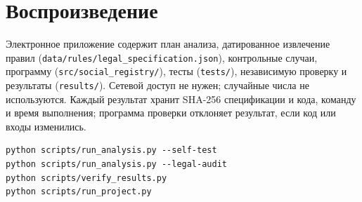 \documentclass[12pt,a4paper]{extarticle}
\begin{document}
\appendix
\section{Воспроизведение}
Электронное приложение содержит план анализа, датированное извлечение правил (\nolinkurl{data/rules/legal_specification.json}), контрольные случаи, программу (\nolinkurl{src/social_registry/}), тесты (\nolinkurl{tests/}), независимую проверку и результаты (\nolinkurl{results/}). Сетевой доступ не нужен; случайные числа не используются. Каждый результат хранит SHA-256 спецификации и кода, команду и время выполнения; программа проверки отклоняет результат, если код или входы изменились.

\begingroup\fontsize{11bp}{13.2bp}\selectfont
\begin{verbatim}
python scripts/run_analysis.py --self-test
python scripts/run_analysis.py --legal-audit
python scripts/verify_results.py
python scripts/run_project.py
\end{verbatim}
\endgroup
\end{document}
